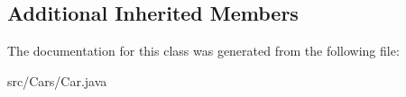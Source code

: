 \subsection*{Additional Inherited Members}


The documentation for this class was generated from the following file\+:\begin{DoxyCompactItemize}
\item 
src/\+Cars/Car.\+java\end{DoxyCompactItemize}
